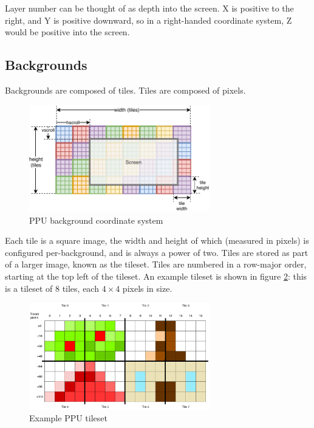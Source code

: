 Layer number can be thought of as depth into the screen. X is positive to the right, and Y is positive downward, so in a right-handed coordinate system, Z would be positive into the screen.

\subsection{Backgrounds}

Backgrounds are composed of tiles. Tiles are composed of pixels.

\begin{figure}[H]
\centering
\caption{PPU background coordinate system}
\label{diagram:ppu_bg_coords}
\includegraphics[width=0.7\textwidth]{diagrams/ppu_bg_coords.pdf}
\end{figure}

Each tile is a square image, the width and height of which (measured in pixels) is configured per-background, and is always a power of two. Tiles are stored as part of a larger image, known as the tileset. Tiles are numbered in a row-major order, starting at the top left of the tileset. An example tileset is shown in figure \ref{diagram:ppu_tileset}: this is a tileset of 8 tiles, each $4\times 4$ pixels in size.

\begin{figure}[H]
\centering
\caption{Example PPU tileset}
\label{diagram:ppu_tileset}
\includegraphics[width=0.7\textwidth]{diagrams/ppu_tileset.pdf}
\end{figure}

